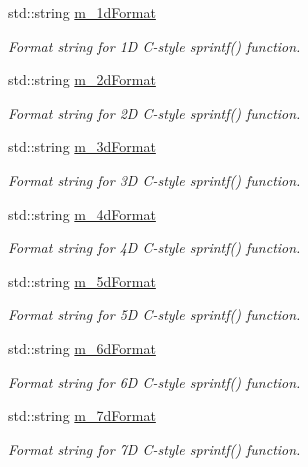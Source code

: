\begin{DoxyCompactItemize}
std\+::string \hyperlink{classns3_1_1FileAggregator_ac0d6eb5be1e146ebba86897303191c88}{m\+\_\+1d\+Format}
\begin{DoxyCompactList}\small\item\em Format string for 1D C-\/style sprintf() function. \end{DoxyCompactList}\item 
std\+::string \hyperlink{classns3_1_1FileAggregator_af26ec05f2349691c0d436d8e15de1831}{m\+\_\+2d\+Format}
\begin{DoxyCompactList}\small\item\em Format string for 2D C-\/style sprintf() function. \end{DoxyCompactList}\item 
std\+::string \hyperlink{classns3_1_1FileAggregator_ab86ae12895719cfb867e102706858cec}{m\+\_\+3d\+Format}
\begin{DoxyCompactList}\small\item\em Format string for 3D C-\/style sprintf() function. \end{DoxyCompactList}\item 
std\+::string \hyperlink{classns3_1_1FileAggregator_a388f2825222368149d5b0abf1bc6b781}{m\+\_\+4d\+Format}
\begin{DoxyCompactList}\small\item\em Format string for 4D C-\/style sprintf() function. \end{DoxyCompactList}\item 
std\+::string \hyperlink{classns3_1_1FileAggregator_a247f50a47e562ed81cb794e4615796f7}{m\+\_\+5d\+Format}
\begin{DoxyCompactList}\small\item\em Format string for 5D C-\/style sprintf() function. \end{DoxyCompactList}\item 
std\+::string \hyperlink{classns3_1_1FileAggregator_ad3cbb0a4fc2b0ec4499bcae467f3a2b8}{m\+\_\+6d\+Format}
\begin{DoxyCompactList}\small\item\em Format string for 6D C-\/style sprintf() function. \end{DoxyCompactList}\item 
std\+::string \hyperlink{classns3_1_1FileAggregator_a99d97fdbd128467b17b8b737c64ad50a}{m\+\_\+7d\+Format}
\begin{DoxyCompactList}\small\item\em Format string for 7D C-\/style sprintf() function. \end{DoxyCompactList}\item 

\end{DoxyCompactItemize}

